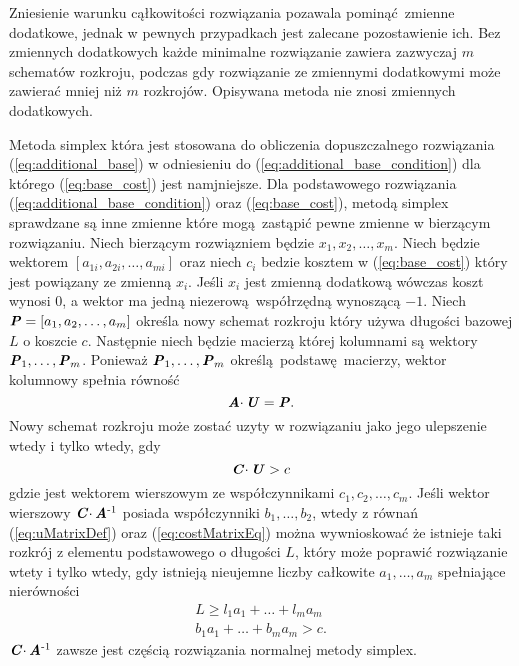 Zniesienie warunku cąłkowitości rozwiązania pozawala pominąć zmienne dodatkowe, jednak w pewnych przypadkach jest zalecane pozostawienie ich. Bez zmiennych dodatkowych każde minimalne rozwiązanie zawiera zazwyczaj $m$ schematów rozkroju, podczas gdy rozwiązanie ze zmiennymi dodatkowymi może zawierać mniej niż $m$ rozkrojów. Opisywana metoda nie znosi zmiennych dodatkowych.

Metoda simplex która jest stosowana do obliczenia dopuszczalnego rozwiązania (\cref{eq:additional_base}) w odniesieniu do (\cref{eq:additional_base_condition}) dla którego (\cref{eq:base_cost}) jest namjniejsze. Dla podstawowego rozwiązania (\cref{eq:additional_base_condition}) oraz (\cref{eq:base_cost}), metodą simplex sprawdzane są inne zmienne które mogą zastąpić pewne zmienne w bierzącym rozwiązaniu. Niech bierzącym rozwiązniem będzie $x_1,x_2,\dots,x_m$. Niech  będzie wektorem $[a_{1i}, a_{2i}, \dots, a_{mi}]$ oraz niech $c_i$ bedzie kosztem w (\cref{eq:base_cost}) który jest powiązany ze zmienną $x_i$. Jeśli $x_i$ jest zmienną dodatkową wówczas koszt wynosi $0$, a wektor ma jedną niezerową współrzędną wynoszącą $-1$. Niech $\textbf{\textit{P}} = [a_1,a_2,\dots,a_m]$ określa nowy schemat rozkroju który używa długości bazowej $L$ o koszcie $c$. Następnie niech  będzie macierzą której kolumnami są wektory $\textbf{\textit{P}}_1,\dots,\textbf{\textit{P}}_m$. Ponieważ $\textbf{\textit{P}}_1, \dots, \textbf{\textit{P}}_m$ określą podstawę macierzy, wektor kolumnowy  spełnia równość
\begin{equation}\label{eq:uMatrixDef}
  \textbf{\textit{A}} \cdotp \textbf{\textit{U}} = \textbf{\textit{P}}.
\end{equation}
Nowy schemat rozkroju może zostać uzyty w rozwiązaniu jako jego ulepszenie wtedy i tylko wtedy, gdy
\begin{equation}\label{eq:costMatrixEq}
  \textbf{\textit{C}} \cdotp \textbf{\textit{U}} > c
\end{equation}
gdzie  jest wektorem wierszowym ze współczynnikami $c_1,c_2,\dots,c_m$. Jeśli wektor wierszowy $\textbf{\textit{C}} \cdotp \textbf{\textit{A}}\textsuperscript{-1}$ posiada współczynniki $b_1,\dots,b_2$, wtedy z równań (\cref{eq:uMatrixDef}) oraz (\cref{eq:costMatrixEq}) można wywnioskować że istnieje taki rozkrój z elementu podstawowego o długości $L$, który może poprawić rozwiązanie wtety i tylko wtedy, gdy istnieją nieujemne liczby całkowite $a_1,\dots,a_m$ spełniające nierówności
\begin{align}
L \ge l_1a_1+\dots+l_ma_m \label{length_eq} \\
b_1a_1+\dots+b_ma_m > c. \label{cost_eq}
\end{align}
$\textbf{\textit{C}} \cdotp \textbf{\textit{A}}\textsuperscript{-1}$ zawsze jest częścią rozwiązania normalnej metody simplex.

